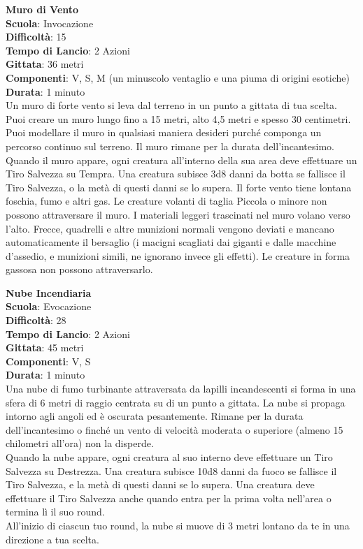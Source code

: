 \begin{multicols}{2}
\medskip\textbf{Muro di Vento}\\
\textbf{Scuola}: Invocazione\\
\textbf{Difficoltà}:  15\\
\textbf{Tempo di Lancio}: 2 Azioni\\
\textbf{Gittata}: 36 metri\\
\textbf{Componenti}: V, S, M (un minuscolo ventaglio e una piuma di origini esotiche)\\
\textbf{Durata}: 1 minuto\\
Un muro di forte vento si leva dal terreno in un punto a gittata di tua scelta. Puoi creare un muro lungo fino a 15 metri, alto 4,5 metri e spesso 30 centimetri. Puoi modellare il muro in qualsiasi maniera desideri purché componga un percorso continuo sul terreno. Il muro rimane per la durata dell'incantesimo. Quando il muro appare, ogni creatura all'interno della sua area deve effettuare un Tiro Salvezza su Tempra. Una creatura subisce 3d8 danni da botta se fallisce il Tiro Salvezza, o la metà di questi danni se lo supera. Il forte vento tiene lontana foschia, fumo e altri gas. Le creature volanti di taglia Piccola o minore non possono attraversare il muro. I materiali leggeri trascinati nel muro volano verso l’alto. Frecce, quadrelli e altre munizioni normali vengono deviati e mancano automaticamente il bersaglio (i macigni scagliati dai giganti e dalle macchine d’assedio, e munizioni simili, ne ignorano invece gli effetti). Le creature in forma gassosa non possono attraversarlo.

\medskip\textbf{Nube Incendiaria}\\
\textbf{Scuola}: Evocazione\\
\textbf{Difficoltà}:  28\\
\textbf{Tempo di Lancio}: 2 Azioni\\
\textbf{Gittata}: 45 metri\\
\textbf{Componenti}: V, S\\
\textbf{Durata}: 1 minuto\\
Una nube di fumo turbinante attraversata da lapilli incandescenti si forma in una sfera di 6 metri di raggio centrata su di un punto a gittata. La nube si propaga intorno agli angoli ed è oscurata pesantemente. Rimane per la durata dell'incantesimo o finché un vento di velocità moderata o superiore (almeno 15 chilometri all'ora) non la disperde.\\
Quando la nube appare, ogni creatura al suo interno deve effettuare un Tiro Salvezza su Destrezza. Una creatura subisce 10d8 danni da fuoco se fallisce il Tiro Salvezza, e la metà di questi danni se lo supera. Una creatura deve effettuare il Tiro Salvezza anche quando entra per la prima volta nell'area o termina lì il suo round.\\
All'inizio di ciascun tuo round, la nube si muove di 3 metri lontano da te in una direzione a tua scelta. 


\end{multicols}
